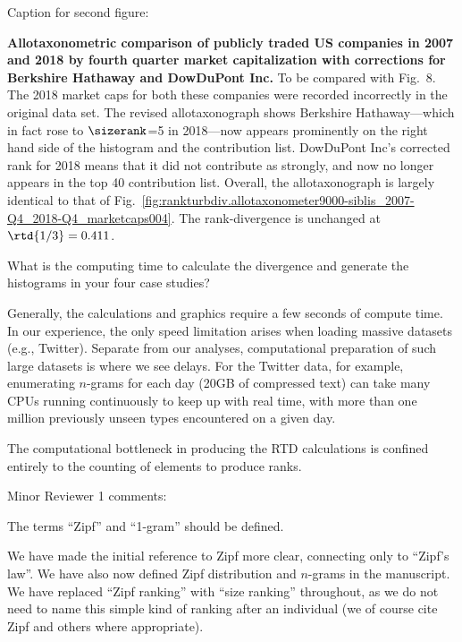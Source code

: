 \clearpage

Caption for second figure:
\begin{excerpt}
  \textbf{Allotaxonometric comparison of publicly traded US companies
    in 2007 and 2018 by fourth quarter market capitalization
    with corrections for Berkshire Hathaway and DowDuPont Inc.}
  To be compared with Fig.~8.
  The 2018 market caps for both these companies were recorded incorrectly
  in the original data set.
  The revised allotaxonograph shows Berkshire Hathaway---which in fact rose to
  $\sizerank$=5 in 2018---now appears prominently
  on the right hand side of the histogram and the contribution list.
  DowDuPont Inc's corrected rank for 2018 means that it did not
  contribute as strongly, and now no longer appears in the top 40 contribution list.
  Overall, the allotaxonograph is largely identical to that
  of Fig.~\ref{fig:rankturbdiv.allotaxonometer9000-siblis_2007-Q4_2018-Q4_marketcaps004}.
  The rank-divergence is unchanged at $\rtd{1/3}=0.411$.
\end{excerpt}


\begin{reviewercomment}
  What is the computing time to calculate the divergence and generate
  the histograms in your four case studies?
\end{reviewercomment}

Generally, the calculations and graphics require a few seconds of
compute time.
In our experience, the only speed limitation arises
when loading massive datasets (e.g., Twitter).
Separate from our analyses, computational preparation of such large datasets
is where we see delays.
For the Twitter data, for example, enumerating $n$-grams for each day
(20GB of compressed text) can take many CPUs running continuously to
keep up with real time, with more than one million previously unseen
types encountered on a given day.

The computational bottleneck in producing the RTD
calculations is confined entirely to the counting of elements to
produce ranks.

\begin{reviewercomment}

  Minor Reviewer 1 comments:

  \bigskip

  The terms ``Zipf'' and ``1-gram'' should be defined.

\end{reviewercomment}


We have made the initial reference to Zipf more clear, connecting only to ``Zipf's law''.
We have also now defined Zipf distribution and $n$-grams in the manuscript. 
We have replaced ``Zipf ranking'' with ``size ranking'' throughout, as we do not need
to name this simple kind of ranking after an individual
(we of course cite Zipf and others where appropriate).

